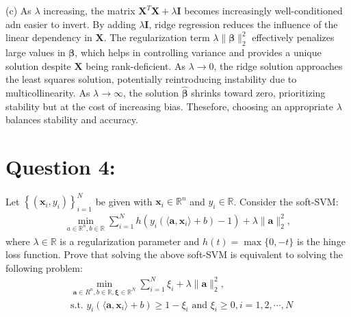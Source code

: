 \documentclass[a4paper,12pt]{article}
\newcommand{\R}{\mathbb{R}}
\begin{document}
(c)
As \(\lambda\) increasing, the matrix \(\bm{X}^T\bm{X} + \lambda\bm{I}\) becomes increasingly well-conditioned adn easier to invert.
By adding \(\lambda\bm{I}\), ridge regression reduces the influence of the linear dependency in \(\bm{X}\).
The regularization term \(\lambda\|\bm{\beta}\|_2^2\) effectively penalizes large values in \(\bm{\beta}\),
which helps in controlling variance and provides a unique solution despite \(\bm{X}\) being rank-deficient.
As \(\lambda \to 0\), the ridge solution approaches the least squares solution, potentially reintroducing instability due to 
multicollinearity. As \(\lambda \to \infty\), the solution \(\hat{\bm{\beta}}\) shrinks toward zero, prioritizing stability but
at the cost of increasing bias. Thesefore, choosing an appropriate \(\lambda\) balances stability and accuracy.




\section*{Question 4:}
Let \(\left\{(\bm{x}_i, y_i)\right\}_{i=1}^N\) be given with \(\bm{x}_i \in \R^n\) and \(y_i \in \R\). Consider the soft-SVM:
\begin{align*}
    \min_{a\in\R^n, b\in \R} \sum_{i=1}^N h(y_i(\langle \bm{a}, \bm{x}_i\rangle + b) - 1) + \lambda\|\bm{a}\|_2^2,
\end{align*}
where \(\lambda \in \R\) is a regularization parameter and \(h(t) = \max\{0, -t\}\) is the hinge loss function. Prove that solving the above soft-SVM is equivalent to solving the following problem:
\begin{align*}
    &\min_{\bm{a} \in R^n, b \in \R, \bm{\xi} \in \R^N} \sum_{i = 1}^N \xi_i + \lambda\|\bm{a}\|_2^2, \\
    &\text{s.t. } y_i(\langle \bm{a}, \bm{x}_i\rangle + b) \geq 1 - \xi_i \text{ and } \xi_i \geq 0, i = 1,2,\cdots,N
\end{align*}
\end{document}
